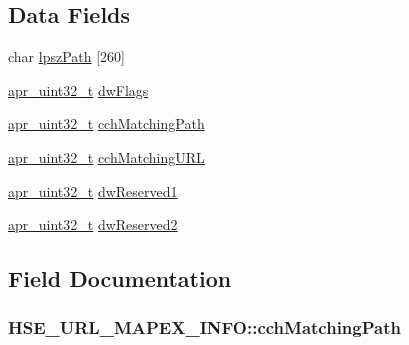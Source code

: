 \subsection*{Data Fields}
\begin{DoxyCompactItemize}
\item 
char \hyperlink{structHSE__URL__MAPEX__INFO_a09e001fcf00e418a52c54c8c7773372f}{lpsz\+Path} \mbox{[}260\mbox{]}
\item 
\hyperlink{group__apr__platform_ga558548a135d8a816c4787250744ea147}{apr\+\_\+uint32\+\_\+t} \hyperlink{structHSE__URL__MAPEX__INFO_a64ab90f1209fd548ca651c4b84d0c7f5}{dw\+Flags}
\item 
\hyperlink{group__apr__platform_ga558548a135d8a816c4787250744ea147}{apr\+\_\+uint32\+\_\+t} \hyperlink{structHSE__URL__MAPEX__INFO_a047315ef940a4e6822197bb08460d8d6}{cch\+Matching\+Path}
\item 
\hyperlink{group__apr__platform_ga558548a135d8a816c4787250744ea147}{apr\+\_\+uint32\+\_\+t} \hyperlink{structHSE__URL__MAPEX__INFO_ade05645e484e71499a0fef14524acb85}{cch\+Matching\+U\+RL}
\item 
\hyperlink{group__apr__platform_ga558548a135d8a816c4787250744ea147}{apr\+\_\+uint32\+\_\+t} \hyperlink{structHSE__URL__MAPEX__INFO_a642e9df90987146b7ae5bc8ffa1b150f}{dw\+Reserved1}
\item 
\hyperlink{group__apr__platform_ga558548a135d8a816c4787250744ea147}{apr\+\_\+uint32\+\_\+t} \hyperlink{structHSE__URL__MAPEX__INFO_a9118b1865d05a5d835d3cee3fe7a0177}{dw\+Reserved2}
\end{DoxyCompactItemize}


\subsection{Field Documentation}
\subsubsection[{\texorpdfstring{cch\+Matching\+Path}{cchMatchingPath}}]{ H\+S\+E\+\_\+\+U\+R\+L\+\_\+\+M\+A\+P\+E\+X\+\_\+\+I\+N\+F\+O\+::cch\+Matching\+Path}\hypertarget{structHSE__URL__MAPEX__INFO_a047315ef940a4e6822197bb08460d8d6}{}\label{structHSE__URL__MAPEX__INFO_a047315ef940a4e6822197bb08460d8d6}
